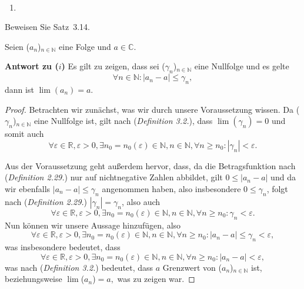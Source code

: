 \bigskip

\begin{lsg}\mbox{ }
\begin{enumerate}[label=$\mathrm{(\roman*)}$, ref=$\mathrm{\roman*}$]
\item
\end{enumerate}
\end{lsg}

\bigskip


\begin{aufg}[6 Punkte]
Beweisen Sie Satz~3.14.
\end{aufg}
 
\bigskip

\begin{lsg}
    Seien ($a_n$)$_{n \in \mathbb{N}}$ eine Folge und $a \in \mathbb{C}.$
    
    \textbf{Antwort zu ($i$)}
        Es gilt zu zeigen, dass sei ($\gamma_n$)$_{n \in \mathbb{N}}$ eine Nullfolge und es gelte $$\forall n \in \mathbb{N}: |a_n - a| \le         \gamma_n,$$dann ist $\lim(a_n)=a.$
    
    \begin{proof}
        Betrachten wir zun\"achst, was wir durch unsere Voraussetzung wissen. Da ($\gamma_n$)$_{n \in \mathbb{N}}$ eine Nullfolge ist, gilt nach (\textit{Definition 3.2.}), dass $\lim(\gamma_n)=0$ und somit auch $$\forall \varepsilon \in \mathbb{R}, \varepsilon > 0, \exists n_0 = n_0(\varepsilon) \in \mathbb{N}, n \in \mathbb{N}, \forall n \ge n_0 : |\gamma_n| < \varepsilon.$$
    
        Aus der Voraussetzung geht au{\ss}erdem hervor, dass, da die Betragsfunktion nach (\textit{Definition 2.29.}) nur auf nichtnegative Zahlen abbildet, gilt $0 \le |a_n - a|$ und da wir ebenfalls $|a_n - a| \le \gamma_n$ angenommen haben, also insbesondere $0 \le \gamma_n$, folgt nach (\textit{Definition 2.29.}) $|\gamma_n| = \gamma_n$, also auch $$\forall \varepsilon \in \mathbb{R}, \varepsilon > 0, \exists n_0 = n_0(\varepsilon) \in \mathbb{N}, n \in \mathbb{N}, \forall n \ge n_0 : \gamma_n < \varepsilon.$$Nun k\"onnen wir unsere Aussage hinzuf\"ugen, also $$\forall \varepsilon \in \mathbb{R}, \varepsilon > 0, \exists n_0 = n_0(\varepsilon) \in \mathbb{N}, n \in \mathbb{N}, \forall n \ge n_0 : |a_n - a| \le \gamma_n < \varepsilon,$$was insbesondere bedeutet, dass $$\forall \varepsilon \in \mathbb{R}, \varepsilon > 0, \exists n_0 = n_0(\varepsilon) \in \mathbb{N}, n \in \mathbb{N}, \forall n \ge n_0 : |a_n - a| < \varepsilon,$$was nach (\textit{Definition 3.2.}) bedeutet, dass $a$ Grenzwert von ($a_n$)$_{n \in \mathbb{N}}$ ist, beziehungsweise $\lim$($a_n$)$=a,$ was zu zeigen war.
    \end{proof}
    

\end{lsg}
